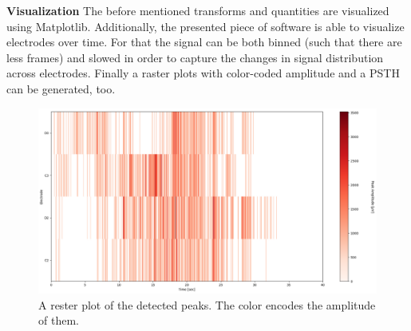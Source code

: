\documentclass[11pt, twocolumn]{article}
\begin{document}
		\textbf{Visualization}
            The before mentioned transforms and quantities are visualized using Matplotlib.
            Additionally, the presented piece of software is able to visualize electrodes over time.
            For that the signal can be both binned (such that there are less frames) and slowed in order to capture the changes in signal distribution across electrodes.
            Finally a raster plots with color-coded amplitude and a PSTH can be generated, too.
			\begin{figure}

			\begin{center}
			\includegraphics[keepaspectratio, width=\linewidth]{img/4_raster_avg.png}
			\end{center}
				\caption{A rester plot of the detected peaks. The color encodes the amplitude of them.}
			\end{figure}
\end{document}
